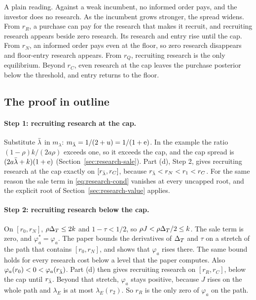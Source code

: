 A plain reading. Against a weak incumbent, no informed order pays, and the investor does no research. As the
incumbent grows stronger, the spread widens. From \(r_R\), a purchase can pay for the research that makes it recruit,
and recruiting research appears beside zero research. Its research and entry rise until the cap. From \(r_N\), an
informed order pays even at the floor, so zero research disappears and floor-entry research appears. From \(r_Q\),
recruiting research is the only equilibrium. Beyond \(r_C\), even research at the cap leaves the purchase posterior
below the threshold, and entry returns to the floor.

\subsection{The proof in outline}

\paragraph{Step 1: recruiting research at the cap.} Substitute \(\bar\lambda\) in \(m_\lambda\): \(m_{\bar\lambda}=1/(2+u)=1/(1+\mathrm{e})\).
In the example the ratio \((1-\rho)k/(2a\rho)\) exceeds one, so it exceeds the cap, and the cap spread is
\((2a\bar\lambda+k)(1+\mathrm{e})\) (Section~\ref{sec:research-sale}). Part (d), Step 2, gives recruiting research at the cap exactly on
\([r_{\bar\lambda},r_C]\), because \(r_{\bar\lambda}<r_N<r_1<r_C\). For the same reason the sale term in \eqref{eq:research-cond}
vanishes at every uncapped root, and the explicit root of Section~\ref{sec:research-value} applies.

\paragraph{Step 2: recruiting research below the cap.} On \([r_0,r_N]\), \(\rho\Delta_T\le2k\) and \(1-\tau<1/2\), so
\(\rho J<\rho\Delta_T/2\le k\). The sale term is zero, and \(\varphi_a^*=\varphi_a\). The paper bounds the derivatives of
\(\Delta_T\) and \(\tau\) on a stretch of the path that contains \([r_0,r_N]\), and shows that \(\varphi_a\) rises there. The
same bound holds for every research cost below a level that the paper computes. Also \(\varphi_a(r_0)<0<\varphi_a(r_{\bar\lambda})\).
Part (d) then gives recruiting research on \([r_R,r_C]\), below the cap until \(r_{\bar\lambda}\). Beyond that stretch,
\(\varphi_a\) stays positive, because \(J\) rises on the whole path and \(\lambda_E\) is at most \(\lambda_E(r_2)\). So
\(r_R\) is the only zero of \(\varphi_a\) on the path.

